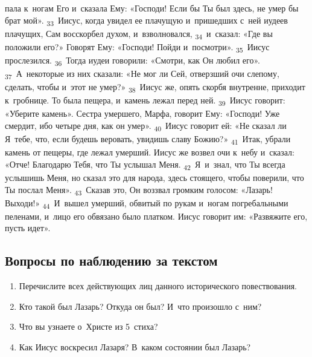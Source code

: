 \documentclass[a4paper,12pt]{article}
\begin{document}
пала к~ногам Его и~сказала Ему: «Господи! Если бы Ты был здесь, не умер бы брат мой». \textsubscript{33}~Иисус, когда увидел ее плачущую и~пришедших с~ней иудеев плачущих, Сам восскорбел духом, и~взволновался, \textsubscript{34}~и~сказал: «Где вы положили его?» Говорят Ему: «Господи! Пойди и~посмотри». \textsubscript{35}~Иисус прослезился. \textsubscript{36}~Тогда иудеи говорили: «Смотри, как Он любил его». \textsubscript{37}~А~некоторые из них сказали: «Не мог ли Сей, отверзший очи слепому, сделать, чтобы и~этот не умер?» \textsubscript{38}~Иисус же, опять скорбя внутренне, приходит к~гробнице. То была пещера, и~камень лежал перед ней. \textsubscript{39}~Иисус говорит: «Уберите камень». Сестра умершего, Марфа, говорит Ему: «Господи! Уже смердит, ибо четыре дня, как он умер». \textsubscript{40}~Иисус говорит ей: «Не сказал ли Я~тебе, что, если будешь веровать, увидишь славу Божию?» \textsubscript{41}~Итак, убрали камень от пещеры, где лежал умерший. Иисус же возвел очи к~небу и~сказал: «Отче! Благодарю Тебя, что Ты услышал Меня. \textsubscript{42}~Я~и~знал, что Ты всегда услышишь Меня, но сказал это для народа, здесь стоящего, чтобы поверили, что Ты послал Меня». \textsubscript{43}~Сказав это, Он воззвал громким голосом: «Лазарь! Выходи!» \textsubscript{44}~И~вышел умерший, обвитый по рукам и~ногам погребальными пеленами, и~лицо его обвязано было платком. Иисус говорит им: «Развяжите его, пусть идет». 

\subsection*{Вопросы по наблюдению за текстом}
\begin{enumerate}
    \item Перечислите всех действующих лиц данного исторического повествования. 
    
    \myline
    
    \myline
    \item Кто такой был Лазарь? Откуда он был? И~что произошло с~ним? 
    
    \myline
    
    \myline
    \item Что вы узнаете о~Христе из 5~стиха? 
    
    \myline
    
    \myline
    \item Как Иисус воскресил Лазаря? В~каком состоянии был Лазарь? 
    
    \myline
    
    \myline
\end{enumerate}
\end{document}

